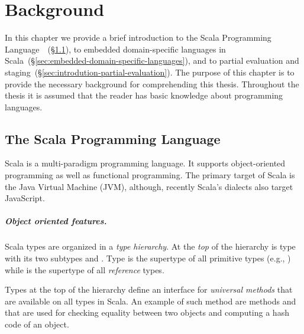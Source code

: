 


\chapter{Background}
\label{ch:background}

In this chapter we provide a brief introduction to the Scala Programming Language~\cite{odersky_scala_2004}~(\S \ref{sec:scala}), to embedded domain-specific languages in Scala~(\S \ref{sec:embedded-domain-specific-languages}), and to partial evaluation and staging~(\S \ref{sec:introdution-partial-evaluation}). The purpose of this chapter is to provide the necessary background for comprehending this thesis. Throughout the thesis it is assumed that the reader has basic knowledge about programming languages.


\section{The Scala Programming Language}
\label{sec:scala}

Scala is a multi-paradigm programming language. It supports object-oriented
programming as well as functional programming. The primary target of Scala is the
Java Virtual Machine (JVM), although, recently Scala's dialects also target JavaScript.

\paragraph{Object oriented features.} Scala types are organized in a \emph{type hierarchy}.
At the \emph{top} of the hierarchy is type  with its two subtypes  and . Type  is the supertype of all primitive types (e.g., ) while  is the supertype
of all \emph{reference} types.

Types at the top of the hierarchy define an interface for \emph{universal methods}
 that are available on all types in Scala. An example of such method are methods
  and  that are used for checking equality between two objects
 and computing a hash code of an object.

